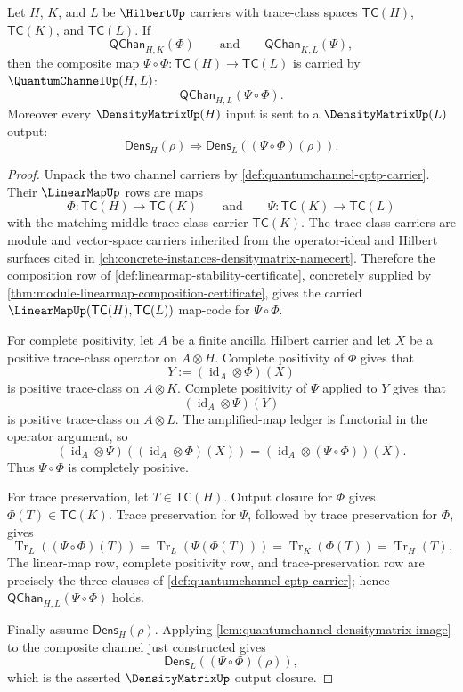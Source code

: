 \begin{theorem}
\label{thm:quantumchannel-composition-closure}
Let $H$, $K$, and $L$ be $\HilbertUp$ carriers with trace-class spaces $\mathsf{TC}(H)$, $\mathsf{TC}(K)$, and $\mathsf{TC}(L)$. If
$$
\mathsf{QChan}_{H,K}(\Phi)
\qquad\text{and}\qquad
\mathsf{QChan}_{K,L}(\Psi),
$$
then the composite map $\Psi\circ\Phi:\mathsf{TC}(H)\to\mathsf{TC}(L)$ is carried by $\QuantumChannelUp(H,L)$:
$$
\mathsf{QChan}_{H,L}(\Psi\circ\Phi).
$$
Moreover every $\DensityMatrixUp(H)$ input is sent to a $\DensityMatrixUp(L)$ output:
$$
\mathsf{Dens}_H(\rho)\Longrightarrow\mathsf{Dens}_L((\Psi\circ\Phi)(\rho)).
$$
\end{theorem}
\begin{proof}
Unpack the two channel carriers by \autoref{def:quantumchannel-cptp-carrier}. Their $\LinearMapUp$ rows are maps
$$
\Phi:\mathsf{TC}(H)\to\mathsf{TC}(K)
\qquad\text{and}\qquad
\Psi:\mathsf{TC}(K)\to\mathsf{TC}(L)
$$
with the matching middle trace-class carrier $\mathsf{TC}(K)$. The trace-class carriers are module and vector-space carriers inherited from the operator-ideal and Hilbert surfaces cited in \autoref{ch:concrete-instances-densitymatrix-namecert}. Therefore the composition row of \autoref{def:linearmap-stability-certificate}, concretely supplied by \autoref{thm:module-linearmap-composition-certificate}, gives the carried $\LinearMapUp(\mathsf{TC}(H),\mathsf{TC}(L))$ map-code for $\Psi\circ\Phi$.

For complete positivity, let $A$ be a finite ancilla Hilbert carrier and let $X$ be a positive trace-class operator on $A\otimes H$. Complete positivity of $\Phi$ gives that
$$
Y:=(\operatorname{id}_A\otimes\Phi)(X)
$$
is positive trace-class on $A\otimes K$. Complete positivity of $\Psi$ applied to $Y$ gives that
$$
(\operatorname{id}_A\otimes\Psi)(Y)
$$
is positive trace-class on $A\otimes L$. The amplified-map ledger is functorial in the operator argument, so
$$
(\operatorname{id}_A\otimes\Psi)((\operatorname{id}_A\otimes\Phi)(X))
=
(\operatorname{id}_A\otimes(\Psi\circ\Phi))(X).
$$
Thus $\Psi\circ\Phi$ is completely positive.

For trace preservation, let $T\in\mathsf{TC}(H)$. Output closure for $\Phi$ gives $\Phi(T)\in\mathsf{TC}(K)$. Trace preservation for $\Psi$, followed by trace preservation for $\Phi$, gives
$$
\operatorname{Tr}_L((\Psi\circ\Phi)(T))
=
\operatorname{Tr}_L(\Psi(\Phi(T)))
=
\operatorname{Tr}_K(\Phi(T))
=
\operatorname{Tr}_H(T).
$$
The linear-map row, complete positivity row, and trace-preservation row are precisely the three clauses of \autoref{def:quantumchannel-cptp-carrier}; hence $\mathsf{QChan}_{H,L}(\Psi\circ\Phi)$ holds.

Finally assume $\mathsf{Dens}_H(\rho)$. Applying \autoref{lem:quantumchannel-densitymatrix-image} to the composite channel just constructed gives
$$
\mathsf{Dens}_L((\Psi\circ\Phi)(\rho)),
$$
which is the asserted $\DensityMatrixUp$ output closure.
\end{proof}

